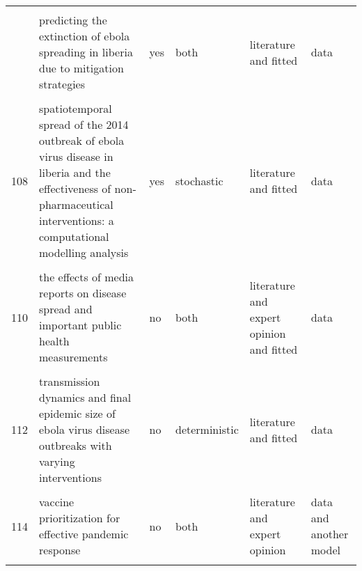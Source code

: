 \documentclass[
]{article}
\begin{document}
\begin{landscape}
\begin{longtable}{l>{\raggedright\arraybackslash}p{3cm}l>{\raggedright\arraybackslash}p{3cm}ll}
\cellcolor{gray!6}{105} & \cellcolor{gray!6}{optimal intervention strategies for a seir control model of ebola epidemics} & \cellcolor{gray!6}{no} & \cellcolor{gray!6}{deterministic} & \cellcolor{gray!6}{literature} & \cellcolor{gray!6}{none}\\
\addlinespace
106 & predicting the extinction of ebola spreading in liberia due to mitigation strategies & yes & both & literature and fitted & data\\
\cellcolor{gray!6}{107} & \cellcolor{gray!6}{school closure strategies for the 2009 hong kong hini influenza pandemic} & \cellcolor{gray!6}{no} & \cellcolor{gray!6}{deterministic} & \cellcolor{gray!6}{expert opinion} & \cellcolor{gray!6}{none}\\
108 & spatiotemporal spread of the 2014 outbreak of ebola virus disease in liberia and the effectiveness of non-pharmaceutical interventions: a computational modelling analysis & yes & stochastic & literature and fitted & data\\
\cellcolor{gray!6}{109} & \cellcolor{gray!6}{strategies for early vaccination during novel influenza outbreaks} & \cellcolor{gray!6}{yes} & \cellcolor{gray!6}{stochastic} & \cellcolor{gray!6}{literature and fitted} & \cellcolor{gray!6}{none}\\
110 & the effects of media reports on disease spread and important public health measurements & no & both & literature and expert opinion and fitted & data\\
\addlinespace
\cellcolor{gray!6}{111} & \cellcolor{gray!6}{the impact of human behavioral changes in 2014 west africa ebola outbreak} & \cellcolor{gray!6}{yes} & \cellcolor{gray!6}{deterministic} & \cellcolor{gray!6}{literature and fitted} & \cellcolor{gray!6}{data}\\
112 & transmission dynamics and final epidemic size of ebola virus disease outbreaks with varying interventions & no & deterministic & literature and fitted & data\\
\cellcolor{gray!6}{113} & \cellcolor{gray!6}{treatment–donation-stockpile dynamics in ebola convalescent blood transfusion therapy} & \cellcolor{gray!6}{no} & \cellcolor{gray!6}{deterministic} & \cellcolor{gray!6}{literature} & \cellcolor{gray!6}{none}\\
114 & vaccine prioritization for effective pandemic response & no & both & literature and expert opinion & data and another model\\
\cellcolor{gray!6}{115} & \cellcolor{gray!6}{a mathematical study of a tb model with treatment interruptions and two latent periods} & \cellcolor{gray!6}{no} & \cellcolor{gray!6}{deterministic} & \cellcolor{gray!6}{literature and expert opinion} & \cellcolor{gray!6}{none}\\

\end{longtable}
\end{landscape}
\end{document}
